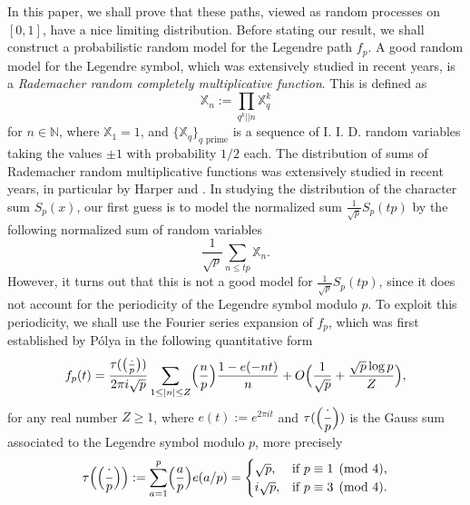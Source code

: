 \documentclass[JEP,XML,SOM,Unicode,NoFloatCountersInSection,published]{cedram}
\theoremstyle{plain}
\theoremstyle{definition}
\newcommand{\Legendre}[2]{\Bigl(\dfrac{#1}{#2}\Bigr)}
\newcommand{\legendre}[2]{\bigl(\tfrac{#1}{#2}\bigr)}
\newcommand{\X}{\mathbb{X}}
\begin{document}
In this paper, we shall prove that these paths, viewed as random processes on $[0, 1]$, have a nice limiting distribution. Before stating our result, we shall construct a probabilistic random model for the Legendre path $f_p$.
A good random model for the Legendre symbol, which was extensively studied in recent years, is a \emph{Rademacher random completely multiplicative function}. This is defined as\vspace*{-3pt}
\begin{equation}\label{eq: RademacherRandom}\X_n:= \prod_{q^k|| n} \X_q^k
\end{equation}
for $n\in \mathbb{N}$, where $\X_1=1$, and $\{\X_q\}_{q \text{ prime}}$ is a sequence of I. I. D. random variables taking the values $\pm 1$ with probability $1/2$ each. The distribution of sums of Rademacher random multiplicative functions was extensively studied in recent years, in particular by Harper \cite{Ha1} and \cite{Ha2}. In studying the distribution of the character sum $S_p(x)$, our first guess is to model the normalized sum $\frac{1}{\sqrt{p}}S_p(tp)$ by the following normalized sum of random variables
\[
\frac{1}{\sqrt{p}}\sum_{n\leq tp }\X_n.\]
However, it turns out that this is not a good model for $\frac{1}{\sqrt{p}}S_p(tp)$, since it does not account for the periodicity of the Legendre symbol modulo $p$. To exploit this periodicity, we shall use the Fourier series expansion of $f_p$, which was first established by Pólya in the following quantitative form \cite[eq.\,(9.19), p.\,311]{MoVaBook}
\begin{equation}\label{eq: definition Legendre path}
f_p(t) = \frac{\tau(\legendre{\cdot}{p})}{2 \pi i \sqrt{p}} \sum_{1 \leq |n| \leq Z} \Legendre{n}{p} \frac{1 - e(-nt)}{n} + O \Bigl(\frac{1}{\sqrt{p}}+\frac{\sqrt{p}\log p}{Z} \Bigr),
\end{equation}
for any real number $Z\geq 1$, where $e(t):= e^{2\pi i t}$ and $\tau(\Legendre{\cdot}{p})$ is the Gauss sum associated to the Legendre symbol modulo $p$, more precisely
\begin{equation}\label{eq: GaussSum}
\begin{aligned}
\tau\Bigl(\Legendre{\cdot}{p}\Bigr) := \sum_{a = 1}^p \Legendre{a}{p} e(a/p) = \begin{cases}
\sqrt{p}, & \text{if } p \equiv 1 \pmod 4, \\
i \sqrt{p}, & \text{if } p \equiv 3 \pmod 4.
\end{cases}
\end{aligned}
\end{equation}
\end{document}

